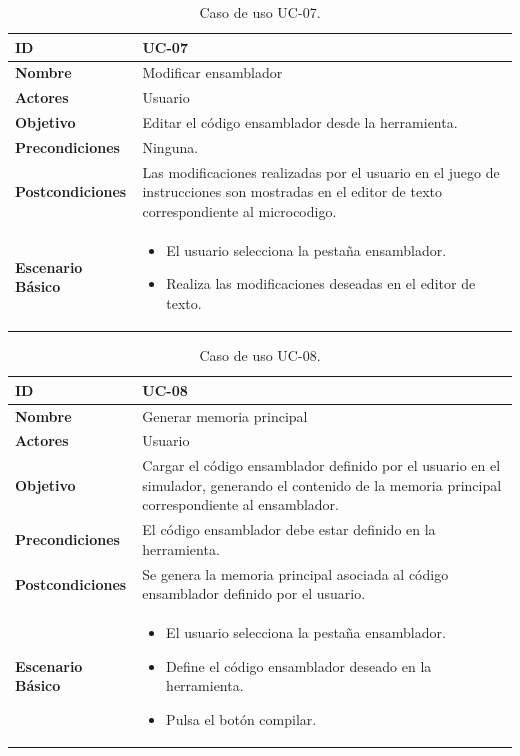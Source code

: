 \begin{center}
\begin{table}[htbp]
\centering
\caption{Caso de uso UC-07.}
\begin{tabular}{@{}p{2.5cm} p{9cm}@{}} 
\toprule
\textbf{ID}	& UC-07  \\
\midrule
\textbf{Nombre} 		& Modificar \gls{ensamblador}   \\
\midrule
\textbf{Actores} 		&	Usuario  \\
\midrule
\textbf{Objetivo} 	&	Editar el código \gls{ensamblador} desde la herramienta. 	 \\
\midrule
\textbf{Precondiciones}	&	Ninguna.   \\
\midrule
\textbf{Postcondiciones} 	& Las modificaciones realizadas por el usuario en el juego de instrucciones son mostradas en el editor de texto correspondiente al \gls{microcodigo}.   \\
\midrule
\textbf{Escenario Básico} 	&  \begin{itemize}
\item El usuario selecciona la pestaña \gls{ensamblador}.
\item Realiza las modificaciones deseadas en el editor de texto.
\end{itemize} \\
\bottomrule
\end{tabular}
\label{tab:uc07}
\end{table}
\end{center}

\begin{center}
\begin{table}[htbp]
\centering
\caption{Caso de uso UC-08.}
\begin{tabular}{@{}p{2.5cm} p{9cm}@{}} 
\toprule
\textbf{ID}	& UC-08  \\
\midrule
\textbf{Nombre} 		& Generar memoria principal   \\
\midrule
\textbf{Actores} 		&	Usuario  \\
\midrule
\textbf{Objetivo} 	&	Cargar el código \gls{ensamblador} definido por el usuario en el simulador, generando el contenido de la memoria principal correspondiente al \gls{ensamblador}. 	 \\
\midrule
\textbf{Precondiciones}	&	El código \gls{ensamblador} debe estar definido en la herramienta.  \\
\midrule
\textbf{Postcondiciones} 	& Se genera la memoria principal asociada al código \gls{ensamblador} definido por el usuario.   \\
\midrule
\textbf{Escenario Básico} 	&  \begin{itemize}
\item El usuario selecciona la pestaña \gls{ensamblador}.
\item Define el código \gls{ensamblador} deseado en la herramienta.
\item Pulsa el botón compilar.
\end{itemize} \\
\bottomrule
\end{tabular}
\label{tab:uc08}
\end{table}
\end{center}

